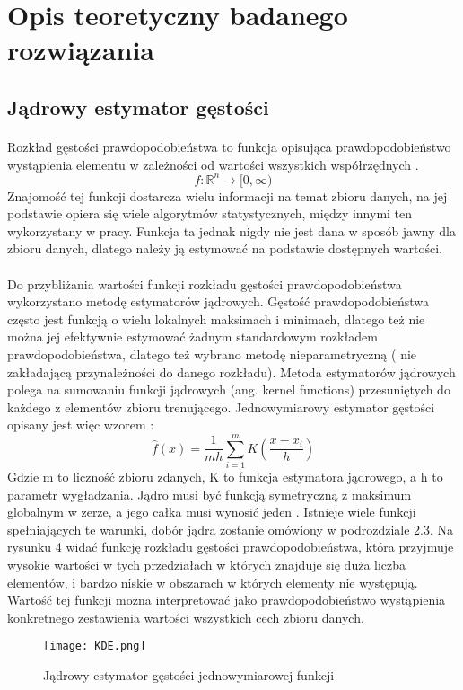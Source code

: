 \documentclass[a4paper,12pt,twoside]{article}
\begin{document}
\newpage
\section{Opis teoretyczny badanego rozwiązania}
\subsection{Jądrowy estymator gęstości}
\paragraph{}
Rozkład gęstości prawdopodobieństwa to funkcja opisująca prawdopodobieństwo wystąpienia elementu w zależności od wartości wszystkich współrzędnych \cite{kde}. 
\begin{equation} f:\mathbb{R}^n\rightarrow [0,\infty )
\end{equation}
Znajomość tej funkcji dostarcza wielu informacji na temat zbioru danych, na jej podstawie opiera się wiele algorytmów statystycznych, między innymi ten wykorzystany w pracy. Funkcja ta jednak nigdy nie jest dana w sposób jawny dla zbioru danych, dlatego należy ją estymować na podstawie dostępnych wartości.
\paragraph{}
Do przybliżania wartości funkcji rozkładu gęstości prawdopodobieństwa wykorzystano metodę estymatorów jądrowych. Gęstość prawdopodobieństwa często jest funkcją o wielu lokalnych maksimach i minimach, dlatego też nie można jej efektywnie estymować  żadnym standardowym rozkładem prawdopodobieństwa, dlatego też wybrano metodę nieparametryczną ( nie zakładającą przynależności do danego rozkładu). Metoda estymatorów jądrowych polega na sumowaniu funkcji jądrowych (ang. kernel functions) przesuniętych do każdego z elementów zbioru trenującego. Jednowymiarowy estymator gęstości opisany jest więc wzorem \cite{kde}:
\begin{equation} \hat{f}(x)=\frac{1}{mh}\sum_{i=1}^{m}K\left ( \frac{x-x_{i}}{h} \right )
\end{equation}
Gdzie m to liczność zbioru zdanych, K to funkcja estymatora jądrowego, a h to parametr wygładzania. Jądro musi być funkcją symetryczną z maksimum globalnym w zerze, a jego całka musi wynosić jeden \cite{kde2}. Istnieje wiele funkcji spełniających te warunki, dobór jądra zostanie omówiony w podrozdziale 2.3. Na rysunku 4 widać  funkcję rozkładu gęstości prawdopodobieństwa, która przyjmuje wysokie wartości w tych przedziałach w których znajduje się duża liczba elementów, i bardzo niskie w obszarach w których elementy nie występują. Wartość tej funkcji można interpretować jako prawdopodobieństwo wystąpienia konkretnego zestawienia wartości wszystkich cech zbioru danych.
\begin{figure}[h]
    \centering
    \texttt{[image: KDE.png]}
    \caption{Jądrowy estymator gęstości jednowymiarowej funkcji}
\end{figure}
\end{document}
